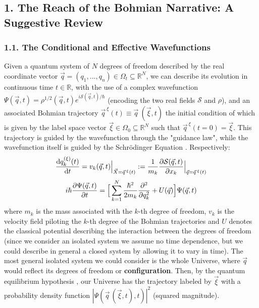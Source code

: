 \documentclass[11pt, a4paper]{article} %
\newcommand{\R}{\mathbb{R}} %
\begin{document}
\subsection*{1. The Reach of the Bohmian Narrative: A Suggestive Review}
\vspace{-0.2cm}

\subsubsection*{1.1. The Conditional and Effective Wavefunctions}
\vspace{-0.2cm}

Given a quantum system of $N$ degrees of freedom described by the real coordinate vector $\vec{q}=(q_1,..., q_n)\in\Omega_t\subseteq\R^N$, we can describe its evolution in continuous time $t\in\R$, with the use of a complex wavefunction $\Psi(\vec{q},t)=\rho^{1/2}(\vec{q},t)e^{i\mathcal{S}(\vec{q},t)/\hbar}$ (encoding the two real fields $\mathcal{S}$ and $\rho$), and an associated Bohmian trajectory $\vec{q}^{\:\xi}(t)\equiv \vec{q}\:(\vec{\xi},t)$ the initial condition of which is given by the label space vector $\vec{\xi}\in\Omega_0\subseteq\R^N$ such that $\vec{q}^{\:\xi}(t=0)=\vec{\xi}$. This trajectory is guided by the wavefunction through the "guidance law", while the wavefunction itself is guided by the Schrödinger Equation \cite{Bohm,Holland,Durr,JordiXavier}. Respectively:\vspace{-0.2cm}
\begin{equation}\label{GL}
\dv{q_k^{ (\xi)}(t)}{t} = v_k(\vec{q},t)\Big\rvert_{\vec{X}=\vec{q}^{\:\xi}(t)}:=\frac{1}{m_k} \pdv{\mathcal{S}(\vec{q},t)}{x_k}\Big\rvert_{\vec{q}=\vec{q}^{\:\xi}(t)}
\end{equation}
\begin{equation}\label{SE}
i\hbar\pdv{\Psi(\vec{q},t)}{t}=\Big[ \sum_{k=1}^N \frac{\hbar^2}{2m_k}\pdv[2]{}{q_k}+U(\vec{q})\Big]\Psi(\vec{q},t)
\end{equation}
where $m_k$ is the mass associated with the $k$-th degree of freedom, $v_k$ is the velocity field piloting the $k$-th degree of the Bohmian trajectories and $U$ denotes the classical potential describing the interaction between the degrees of freedom (since we consider an isolated system we assume no time dependence, but we could describe in general a closed system by allowing it to vary in time). The most general isolated system we could consider is the whole Universe, where $\vec{q}$ would reflect its degrees of freedom or {\bf configuration}. Then, by the quantum equilibrium hypothesis \cite{Absolute}, our Universe has the trajectory labeled by $\vec{\xi}$ with a probability density function $|\Psi(\vec{q}\,(\vec{\xi},t),t)|^2$ (squared magnitude). 
\end{document}
